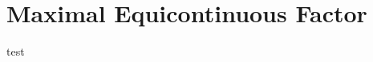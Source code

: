 \section{Maximal Equicontinuous Factor}
\begin{frame}
\begin{theorem}[test]
test
\cite{OpmeerCurtain2004}
\end{theorem}
\end{frame}

